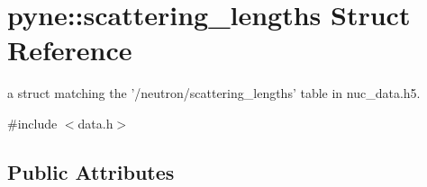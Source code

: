 \hypertarget{structpyne_1_1scattering__lengths}{\section{pyne\+:\+:scattering\+\_\+lengths Struct Reference}
\label{structpyne_1_1scattering__lengths}
}


a struct matching the '/neutron/scattering\+\_\+lengths' table in nuc\+\_\+data.\+h5.  




{\ttfamily \#include $<$data.\+h$>$}

\subsection*{Public Attributes}
